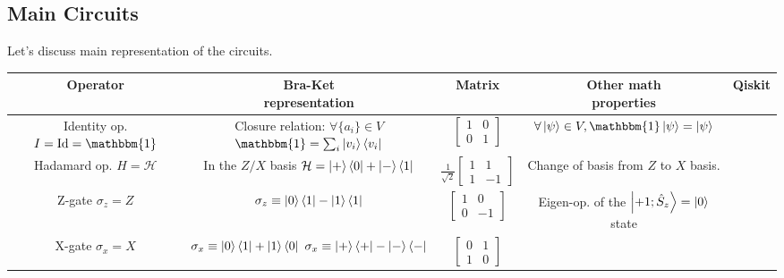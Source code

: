 \subsection*{Main Circuits}
Let's discuss main representation of the circuits.

\begin{table}[ht!]
  \centering
  \begin{tabular}{|c|c|c|c|c|}
    \hline
    Operator & \makecell{Bra-Ket \\ representation} & Matrix & \makecell{Other math \\ properties} & Qiskit \\
    \hline 
    \hline
    \makecell{Identity op. \\ $I=\text{Id}=\mathbbm{1}$}  & \makecell{Closure relation: \\ $\forall \{a_i\}\in V$ \\ $\mathbbm{1}=\sum_i \ket{v_i}\bra{v_i}$ } & $\begin{bmatrix} 1 & 0 \\ 0 & 1 \end{bmatrix}$ & $\forall \ket{\psi} \in V , \mathbbm{1}\ket{\psi}=\ket{\psi}$ &  \\
    \hline
    \makecell{Hadamard op. \\ $H=\mathcal{H}$ } & \makecell{In the $Z/X$ basis \\ $\mathcal{H}=\ket{+}\bra{0} + \ket{-}\bra{1}$} &
    $\frac{1}{\sqrt{2}}\begin{bmatrix} 1 & 1 \\ 1 & -1 \end{bmatrix}$ & \makecell{Change of basis from \\ $Z$ to $X$ basis.} & \\
    \hline 
    \makecell{Z-gate \\ $\sigma_z = Z$} & $\sigma_z \equiv \ket{0}\bra{1} - \ket{1}\bra{1}$ & $ \begin{bmatrix} 1 & 0 \\ 0 & -1 \end{bmatrix} $ &
    \makecell{Eigen-op. of the \\ $\ket{+1;\hat{S}_z}=\ket{0}$ state} & \\
    \hline
    \makecell{X-gate \\ $\sigma_x = X$} & \makecell{$\sigma_x \equiv \ket{0}\bra{1}+\ket{1}\bra{0}$ \\ $\sigma_x \equiv \ket{+}\bra{+} - \ket{-}\bra{-}$ } & $\begin{bmatrix} 0 & 1 \\ 1 & 0 \end{bmatrix}$ & 

\end{tabular}
\end{table}
